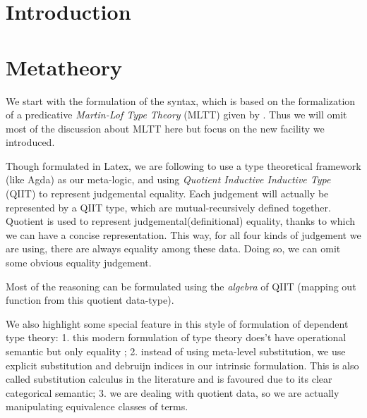 \begin{abstract}

\end{abstract}

\maketitle

\section{Introduction}
\label{sec:intro}

\section{Metatheory}
\label{sec:metatheory}

We start with the formulation of the syntax, which is based on the formalization of a predicative \textit{Martin-Lof Type Theory} (MLTT) given by \citep{coquand2018canonicity}. Thus we will omit most of the discussion about MLTT here but focus on the new facility we introduced. 

Though formulated in Latex, we are following \citep{kaposi2017type} to use a type theoretical framework (like Agda) as our meta-logic, 
and using \textit{Quotient Inductive Inductive Type} (QIIT) to represent judgemental equality. Each judgement will actually be represented by a QIIT type, which are mutual-recursively defined together. Quotient is used to represent judgemental(definitional) equality, thanks to which we can have a concise representation. This way, for all four kinds of judgement we are using, there are always equality among these data. Doing so, we can omit some obvious equality judgement. 

Most of the reasoning can be formulated using the \textit{algebra} of QIIT (mapping out function from this quotient data-type). 

We also highlight some special feature in this style of formulation of dependent type theory: 1. this modern formulation of type theory does't have operational semantic but only equality 
;
2. instead of using meta-level substitution, we use explicit substitution and debruijn indices in our intrinsic formulation. This is also called substitution calculus in the literature and is favoured due to its clear categorical semantic; 
3. we are dealing with quotient data, so we are actually manipulating equivalence classes of terms. 

